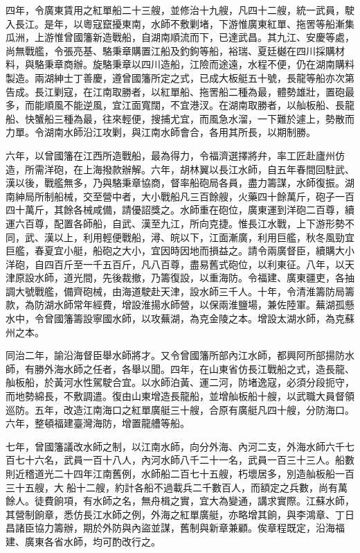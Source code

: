 \begin{pinyinscope}
四年，令廣東賃用之紅單船二十三艘，並修治十九艘，凡四十二艘，統一武員，駛入長江。是年，以粵寇竄擾東南，水師不敷剿堵，下游惟廣東紅單、拖罟等船漸集瓜洲，上游惟曾國籓新造戰船，自湖南順流而下，已達武昌。其九江、安慶等處，尚無戰艦，令張亮基、駱秉章購置江船及釣鉤等船，裕瑞、夏廷樾在四川採購材料，與駱秉章商辦。旋駱秉章以四川造船，江險而途遠，水程不便，仍在湖南購料製造。兩湖紳士丁善慶，遵曾國籓所定之式，已成大板艇五十號，長龍等船亦次第告成。長江剿寇，在江南取勝者，以紅單船、拖罟船二種為最，體勢雄壯，置砲最多，而能順風不能逆風，宜江面寬闊，不宜港汊。在湖南取勝者，以舢板船、長龍船、快蟹船三種為最，往來輕便，搜捕尤宜，而風急水溜，一下難於遽上，勢散而力單。令湖南水師沿江攻剿，與江南水師會合，各用其所長，以期制勝。

六年，以曾國籓在江西所造戰船，最為得力，令福濟選擇將弁，率工匠赴廬州仿造，所需洋砲，在上海撥款辦解。六年，胡林翼以長江水師，自五年春間回駐武、漢以後，戰艦無多，乃與駱秉章協商，督率船砲局各員，盡力籌謀，水師復振。湖南紳局所制船械，交至營中者，大小戰船凡三百餘艘，火藥四十餘萬斤，砲子一百四十萬斤，其餘各械咸備，請優詔獎之。水師重在砲位，廣東運到洋砲二百尊，續運六百尊，配置各師船，自武、漢至九江，所向克捷。惟長江水戰，上下游形勢不同，武、漢以上，利用輕便戰船，潯、皖以下，江面漸廣，利用巨艦，秋冬風勁宜巨艦，春夏宜小艇，船砲之大小，宜因時因地而損益之。請令兩廣督臣，續購大小洋砲，自四百斤至一千五百斤，凡八百尊，盡易舊式砲位，以利東征。八年，以天津原設水師，道光間，先後裁撤，乃籌復設，以重海防。令福建、廣東疆吏，各抽調大號戰艦，備齊砲械，由海道駛赴天津，設水師三千人。十年，令清淮籌防局籌款，為防湖水師常年經費，增設淮揚水師營，以保兩淮鹽場，兼佐陸軍。蕪湖孤懸水中，令曾國籓籌設寧國水師，以攻蕪湖，為克金陵之本。增設太湖水師，為克蘇州之本。

同治二年，諭沿海督臣舉水師將才。又令曾國籓所部內江水師，都興阿所部揚防水師，有勝外海水師之任者，各舉以聞。四年，在山東省仿長江戰船之式，造長龍、舢板船，於黃河水性駕駛合宜。以水師泊黃、運二河，防堵逸寇，必須分段扼守，而地勢綿長，不敷調遣。復由山東增造長龍船，並增舢板船十艘，以武職大員督領巡防。五年，改造江南海口之紅單廣艇三十艘，合原有廣艇凡四十艘，分防海口。六年，整頓福建臺灣海防，增置龍艚等船。

七年，曾國籓議改水師之制，以江南水師，向分外海、內河二支，外海水師六千七百七十六名，武員一百十八人，內河水師八千二十一名，武員一百三十三人。船數則近稽道光二十四年江南舊例，水師船二百七十五艘，朽壞居多，別造舢板船一百三十五艘，大船十二艘，約計各船不過載兵二千數百人，而額定之兵數，尚有萬餘人。徒費餉項，有水師之名，無舟楫之實，宜大為變通，講求實際。江蘇水師，其營制餉章，悉仿長江水師之例，外海之紅單廣艇，亦略增其餉，與李鴻章、丁日昌諸臣協力籌辦，期於外防與內盜並謀，舊制與新章兼顧。俟章程既定，沿海福建、廣東各省水師，均可酌改行之。


\end{pinyinscope}
